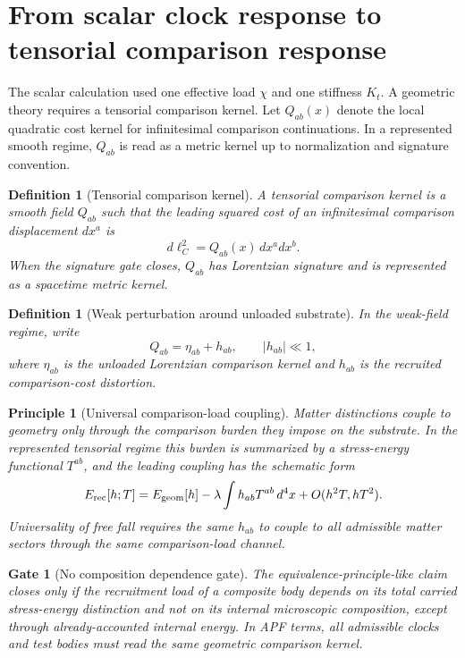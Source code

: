 \documentclass[11pt]{article}
\newtheorem{definition}[theorem]{Definition}
\newtheorem{principle}[theorem]{Principle}
\newtheorem{gate}[theorem]{Gate}
\theoremstyle{remark}
\newcommand{\Erec}{E_{\rm rec}}
\newcommand{\Egeom}{E_{\rm geom}}
\begin{document}
\section{From scalar clock response to tensorial comparison response}

The scalar calculation used one effective load \(\chi\) and one stiffness \(K_t\).  A geometric theory requires a tensorial comparison kernel.  Let \(Q_{ab}(x)\) denote the local quadratic cost kernel for infinitesimal comparison continuations.  In a represented smooth regime, \(Q_{ab}\) is read as a metric kernel up to normalization and signature convention.

\begin{definition}[Tensorial comparison kernel]
A tensorial comparison kernel is a smooth field \(Q_{ab}\) such that the leading squared cost of an infinitesimal comparison displacement \(dx^a\) is
\[
        d\ell_C^2 = Q_{ab}(x)\,dx^a dx^b.
\]
When the signature gate closes, \(Q_{ab}\) has Lorentzian signature and is represented as a spacetime metric kernel.
\end{definition}

\begin{definition}[Weak perturbation around unloaded substrate]
In the weak-field regime, write
\[
        Q_{ab}=\eta_{ab}+h_{ab},
        \qquad |h_{ab}|\ll 1,
\]
where \(\eta_{ab}\) is the unloaded Lorentzian comparison kernel and \(h_{ab}\) is the recruited comparison-cost distortion.
\end{definition}

\begin{principle}[Universal comparison-load coupling]
Matter distinctions couple to geometry only through the comparison burden they impose on the substrate.  In the represented tensorial regime this burden is summarized by a stress-energy functional \(T^{ab}\), and the leading coupling has the schematic form
\[
        \Erec[h;T]
        =\Egeom[h]-\lambda\int h_{ab}T^{ab}\,d^4x+O(h^2T,hT^2).
\]
Universality of free fall requires the same \(h_{ab}\) to couple to all admissible matter sectors through the same comparison-load channel.
\end{principle}

\begin{gate}[No composition dependence gate]
The equivalence-principle-like claim closes only if the recruitment load of a composite body depends on its total carried stress-energy distinction and not on its internal microscopic composition, except through already-accounted internal energy.  In APF terms, all admissible clocks and test bodies must read the same geometric comparison kernel.
\end{gate}
\end{document}
